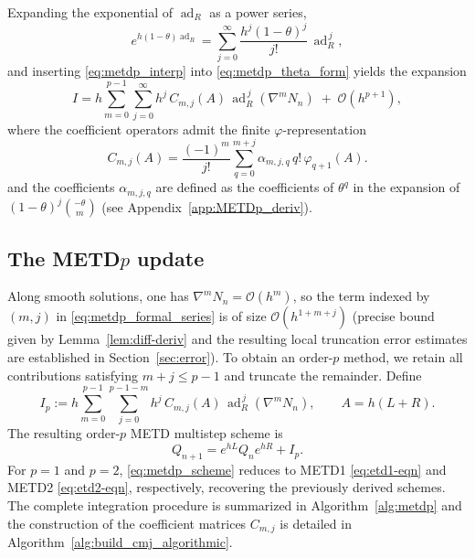 \documentclass[12pt]{article}
\DeclareMathOperator{\ad}{ad}
\begin{document}
Expanding the exponential of $\ad_R$ as a power series,
\begin{equation*}
e^{h(1-\theta)\ad_R}=\sum_{j=0}^{\infty}\frac{h^j(1-\theta)^j}{j!}\,\ad_R^{\,j},
\end{equation*}
and inserting \eqref{eq:metdp_interp} into \eqref{eq:metdp_theta_form} yields the expansion
\begin{equation}
\label{eq:metdp_formal_series}
    I
    = h\sum_{m=0}^{p-1}\sum_{j=0}^{\infty} h^j\,C_{m,j}(A)\,
    \ad_R^{\,j}\!\left(\nabla^m N_n\right)
    \;+\;\mathcal O(h^{p+1}),
\end{equation}
where the coefficient operators admit the finite $\varphi$-representation
\begin{equation}
\label{eq:metdp_Cmj}
    C_{m,j}(A) = \frac{(-1)^m}{j!}\sum_{q=0}^{m+j} \alpha_{m,j,q}\,q!\,\varphi_{q+1}(A).
\end{equation}
and the coefficients $\alpha_{m,j,q}$ are defined as the coefficients of $\theta^q$ in the expansion of $(1-\theta)^j\binom{-\theta}{m}$ (see Appendix~\ref{app:METDp_deriv}).

\subsection{The METD\texorpdfstring{$p$}{p} update}
Along smooth solutions, one has $\nabla^m N_n=\mathcal O(h^m)$, so the term indexed by $(m,j)$ in \eqref{eq:metdp_formal_series} is of size $\mathcal O(h^{1+m+j})$ (precise bound given by Lemma~\ref{lem:diff-deriv} and the resulting local truncation error estimates are established in Section~\ref{sec:error}).
To obtain an order-$p$ method, we retain all contributions satisfying $m+j\le p-1$ and truncate the remainder.
Define
\begin{equation}
\label{eq:metdp_Ip}
    I_p := h\sum_{m=0}^{p-1}\sum_{j=0}^{p-1-m} h^j\,C_{m,j}(A)\,
    \ad_R^{\,j}\!\left(\nabla^m N_n\right),
    \qquad A=h(L+R).
\end{equation}
The resulting order-$p$ METD multistep scheme is
\begin{equation}
\label{eq:metdp_scheme}
    Q_{n+1}=e^{hL}Q_ne^{hR}+I_p.
\end{equation}
For $p=1$ and $p=2$, \eqref{eq:metdp_scheme} reduces to METD1 \eqref{eq:etd1-eqn} and METD2 \eqref{eq:etd2-eqn}, respectively, recovering the previously derived schemes. The complete integration procedure is summarized in Algorithm~\ref{alg:metdp} and the construction of the coefficient matrices $C_{m,j}$ is detailed in Algorithm~\ref{alg:build_cmj_algorithmic}.
\end{document}
